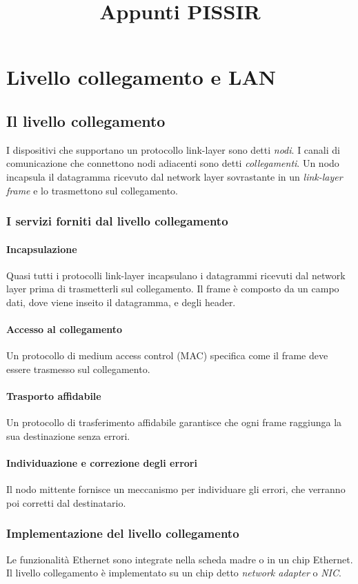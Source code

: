 \documentclass[11pt]{book}
\title{Appunti PISSIR}
\begin{document}
\chapter{Livello collegamento e LAN}
\section{Il livello collegamento}
I dispositivi che supportano un protocollo link-layer sono detti \textit{nodi}. I canali di comunicazione che connettono
nodi adiacenti sono detti \textit{collegamenti}. Un nodo incapsula il datagramma ricevuto dal network layer sovrastante 
in un \textit{link-layer frame} e lo trasmettono sul collegamento.
\subsection{I servizi forniti dal livello collegamento}
\subsubsection{Incapsulazione}
Quasi tutti i protocolli link-layer incapsulano i datagrammi ricevuti dal network layer prima di trasmetterli sul collegamento.
Il frame è composto da un campo dati, dove viene inseito il datagramma, e degli header.
\subsubsection{Accesso al collegamento}
Un protocollo di medium access control (MAC) specifica come il frame deve essere trasmesso sul collegamento. 
\subsubsection{Trasporto affidabile}
Un protocollo di trasferimento affidabile garantisce che ogni frame raggiunga la sua destinazione senza errori.
\subsubsection{Individuazione e correzione degli errori}
Il nodo mittente fornisce un meccanismo per individuare gli errori, che verranno poi corretti dal destinatario.
\subsection{Implementazione del livello collegamento}
Le funzionalità Ethernet sono integrate nella scheda madre o in un chip Ethernet. Il livello collegamento è implementato su un chip 
detto \textit{network adapter} o \textit{NIC}. 
\end{document}
